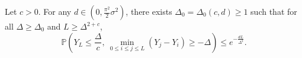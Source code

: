 \begin{lemma}[Lemma 3.5]
Let $c>0$. For any $d\in(0,\frac{\pi^2}2\sigma^2)$, there exists $\Delta_0=\Delta_0(c,d)\ge 1$ such that for all $\Delta\ge\Delta_0$ and $L\ge\Delta^{2+c}$,
\[
    \mathbb P\!\left(
        Y_L\le\frac{\Delta}{c},\ 
        \min_{0\le i\le j\le L}(Y_j-Y_i)\ge-\Delta
    \right)
    \le
    e^{-\frac{dL}{\Delta^2}}.
\]
\end{lemma}
